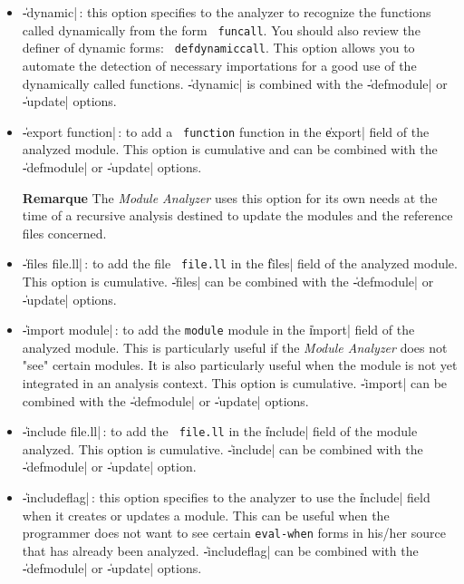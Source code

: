 \begin{itemize}
\item {\Large \|-dynamic|}\,: this option specifies to the analyzer to recognize the functions called dynamically from the form {\tt
funcall}.  You should also review the definer of dynamic forms:  {\tt
defdynamiccall}.
This option allows you to automate the detection of necessary importations for a good use of the dynamically called functions.
\|-dynamic| is combined with the \|-defmodule| or \|-update| options.

\item {\Large \|-export function|}\,: to add a {\tt
function} function in the \|export| field of the analyzed module.
This option is cumulative and can be combined with the \|-defmodule| or \|-update| options.
\begin{Side}{\bf Remarque}
The {\em Module Analyzer} uses this option for its own needs at the time of a recursive analysis destined to update the modules and the reference files concerned.  
\end{Side}

\item {\Large \|-files file.ll|}\,: to add the file {\tt
file.ll} in the \|files| field of the analyzed module.
This option is cumulative.  \|-files| can be combined with the \|-defmodule| or \|-update| options.

\item {\Large \|-import module|}\,: to add 
the {\tt module} module in the \|import| field of the analyzed module.
This is particularly useful if the {\em Module Analyzer} does not "see" certain modules.  It is also particularly useful when the module is not yet integrated in an analysis context.
This option is cumulative.
\|-import| can be combined with the \|-defmodule| or \|-update| options.

\item {\Large \|-include file.ll|}\,: to add the {\tt
file.ll} in the  \|include| field of the module analyzed.
This option is cumulative.  \|-include| can be combined with the \|-defmodule| or \|-update| option.

\item {\Large \|-includeflag|}\,:  this option specifies to the analyzer to use the \|include| field when it creates or updates a module.  This can be useful when the programmer does not want to see certain {\tt eval-when} forms in his/her source that has already been analyzed. 
\|-includeflag| can be combined with the \|-defmodule| or \|-update| options.


\end{itemize}
